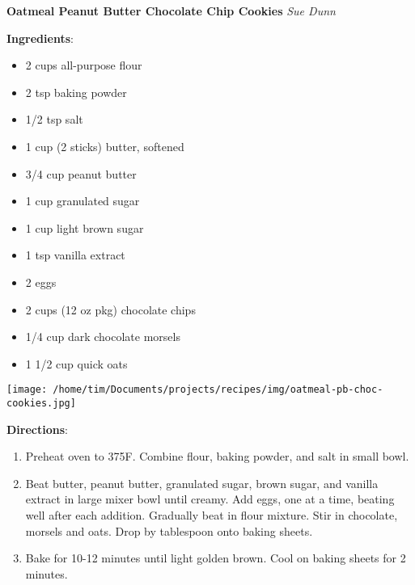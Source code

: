 \documentclass[11pt, twoside, openany]{book}
\begin{document}
\noindent\begin{minipage}[t]{\linewidth}%
{\Large\textbf{Oatmeal Peanut Butter Chocolate Chip Cookies}} \label{oatmeal-peanut-butter-chocolate-chip-cookies}\hfill\textit{Sue Dunn}\\
\noindent\begin{minipage}[t]{0.78\linewidth}%
\textbf{Ingredients}:\vspace{-3mm}
\begin{multicols}{2}
\begin{itemize}\setlength\itemsep{-1mm}
\item 2 cups all-purpose flour
\item 2 tsp baking powder
\item 1/2 tsp salt
\item 1 cup (2 sticks) butter, softened
\item 3/4 cup peanut butter
\item 1 cup granulated sugar
\item 1 cup light brown sugar
\item 1 tsp vanilla extract
\item 2 eggs
\item 2 cups (12 oz pkg) chocolate chips
\item 1/4 cup dark chocolate morsels
\item 1 1/2 cup quick oats
\end{itemize}
\end{multicols}
\end{minipage}
\noindent\begin{minipage}[t]{0.18\linewidth}
\centering \strut\vspace*{-\baselineskip}\newline
\texttt{[image: /home/tim/Documents/projects/recipes/img/oatmeal-pb-choc-cookies.jpg]}\\
\end{minipage}\vspace{3mm}
\textbf{Directions}:
\vspace{-3mm}\begin{enumerate}\setlength\itemsep{-1mm}
\item Preheat oven to 375F. Combine flour, baking powder, and salt in small bowl.
\item Beat butter, peanut butter, granulated sugar, brown sugar, and vanilla extract in large mixer bowl until creamy. Add eggs, one at a time, beating well after each addition. Gradually beat in flour mixture. Stir in chocolate, morsels and oats. Drop by tablespoon onto baking sheets.
\item Bake for 10-12 minutes until light golden brown. Cool on baking sheets for 2 minutes.
\end{enumerate}
\end{minipage}\vspace{8mm}
\end{document}
